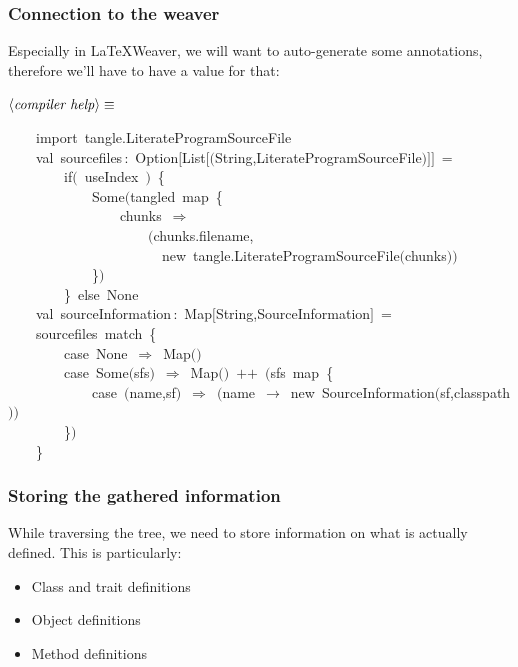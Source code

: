 \documentclass[a4paper,12pt]{article}
\begin{document}
\subsubsection{Connection to the weaver}
Especially in LaTeXWeaver, we will want to auto-generate some annotations,
therefore we'll have to have a value for that:

$\left<\mbox{\emph{compiler help}}\right>\equiv$
\begin{program}~~~~{\vem import}~tangle.LiterateProgramSourceFile
\\~~~~{\vem val}~sourcefiles\,{\rm :}~Option$[$List$[$$($String,LiterateProgramSourceFile$)$$]$$]$~=
\\~~~~~~~~{\vem if}$($~useIndex~$)$~{\small\{}
\\~~~~~~~~~~~~Some$($tangled~map~{\small\{}
\\~~~~~~~~~~~~~~~~chunks~$\Rightarrow$
\\~~~~~~~~~~~~~~~~~~~~$($chunks.filename,
\\~~~~~~~~~~~~~~~~~~~~~~{\vem new}~tangle.LiterateProgramSourceFile$($chunks$)$$)$
\\~~~~~~~~~~~~{\small\}}$)$
\\~~~~~~~~{\small\}}~{\vem else}~None
\\[0.5em]~~~~{\vem val}~sourceInformation\,{\rm :}~Map$[$String,SourceInformation$]$~=
\\~~~~sourcefiles~{\vem match}~{\small\{}
\\~~~~~~~~{\vem case}~None~$\Rightarrow$~Map$($$)$
\\~~~~~~~~{\vem case}~Some$($sfs$)$~$\Rightarrow$~Map$($$)$~$+$$+$~$($sfs~map~{\small\{}
\\~~~~~~~~~~~~{\vem case}~$($name,sf$)$~$\Rightarrow$~$($name~$\rightarrow$~{\vem new}~SourceInformation$($sf,classpath$)$$)$
\\~~~~~~~~{\small\}}$)$
\\~~~~{\small\}}
\\[0.5em]\end{program}
\subsubsection{Storing the gathered information}
While traversing the tree, we need to store information on what is actually
defined. This is particularly:

\begin{itemize}
\item Class and trait definitions
\item Object definitions
\item Method definitions
\end{itemize}
\end{document}
